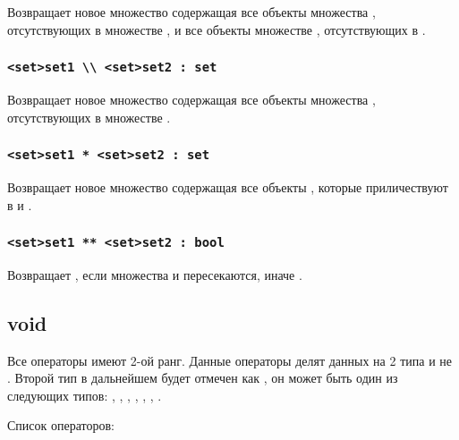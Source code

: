 \documentclass[a4paper, 14pt]{extarticle}
\begin{document}
Возвращает новое множество содержащая все объекты множества , отсутствующих в множестве , и все объекты множестве , отсутствующих в .

\subsubsection{\lstinline`<set>set1 \\ <set>set2 : set`}

Возвращает новое множество содержащая все объекты множества , отсутствующих в множестве .

\subsubsection{\lstinline`<set>set1 * <set>set2 : set`}

Возвращает новое множество содержащая все объекты , которые приличествуют в  и .

\subsubsection{\lstinline`<set>set1 ** <set>set2 : bool`}

Возвращает \true, если множества  и  пересекаются, иначе \false.

\subsection{\color{bluemarin}void}

Все \void{} операторы имеют 2-ой ранг. Данные операторы делят данных на 2 типа \void{} и не \void{}. Второй тип в дальнейшем будет отмечен как , он может быть один из следующих типов: \integer{}, \double{}, \str{}, \listtype{}, \object{}, \set{}, \element{}.

Список \void{} операторов:
\end{document}
